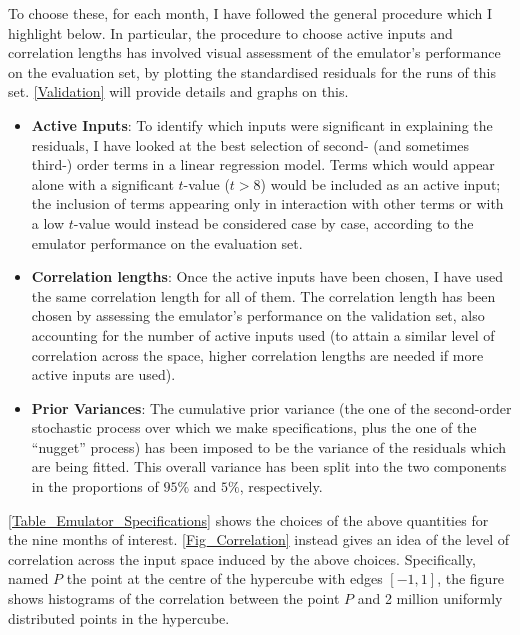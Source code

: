 \documentclass[a4paper, 12pt]{article}
\begin{document}
To choose these, for each month, I have followed the general procedure which I highlight below. In particular, the procedure to choose active inputs and correlation lengths has involved visual assessment of the emulator's performance on the evaluation set, by plotting the standardised residuals for the runs of this set. \autoref{Validation} will provide details and graphs on this. 

\begin{itemize}
\item {\bf Active Inputs}: To identify which inputs were significant in explaining the residuals, I have looked at the best selection of second- (and sometimes third-) order terms in a linear regression model. 
Terms which would appear alone with a significant $t$-value ($t>8$) would be included as an active input; the inclusion of terms appearing only in interaction with other terms or with a low $t$-value would instead be considered case by case, according to the emulator performance on the evaluation set.
\item {\bf Correlation lengths}: Once the active inputs have been chosen, I have used the same correlation length for all of them. The correlation length has been chosen by assessing the emulator's performance on the validation set, also accounting for the number of active inputs used
(to attain a similar level of correlation across the space, higher correlation lengths are needed if more active inputs are used).
\item {\bf Prior Variances}: The cumulative prior variance (the one of the second-order stochastic process over which we make specifications, plus the one of the ``nugget'' process) has been imposed to be the variance of the residuals which are being fitted. This overall variance has been split into the two components in the proportions of $95\%$ and $5\%$, respectively.
\end{itemize}

\autoref{Table_Emulator_Specifications} shows the choices of the above quantities for the nine months of interest.
\autoref{Fig_Correlation} instead gives an idea of the level of correlation across the input space induced by the above choices. Specifically, named $P$ the point at the centre of the hypercube with edges $[-1,1]$, the figure shows histograms of the correlation between the point $P$ and 2 million uniformly distributed points in the hypercube.
\end{document}
